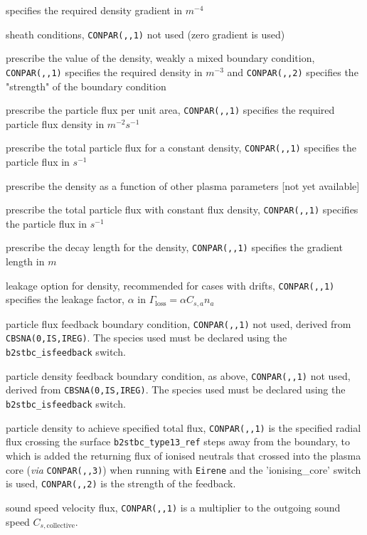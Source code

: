 \documentclass[a4paper,10pt]{report}
\begin{document}
\begin{description}
\begin{description}
  specifies the required density gradient in $m^{-4}$
  \item[3] sheath conditions, {\tt CONPAR(,,1)} not used (zero
  gradient is used)
  \item[4] prescribe the value of the density, weakly a mixed boundary
  condition, {\tt CONPAR(,,1)} specifies the required density in
  $m^{-3}$ and {\tt CONPAR(,,2)} specifies the "strength" of the
  boundary condition
  \item[5] prescribe the particle flux per unit area,
  {\tt CONPAR(,,1)} specifies the required particle flux density in
  $m^{-2} s^{-1}$
  \item[6] prescribe the total particle flux for a constant density,
  {\tt CONPAR(,,1)} specifies the particle flux in
  $s^{-1}$
  \item[7] prescribe the density as a function of other plasma
  parameters [not yet available]
  \item[8] prescribe the total particle flux with constant flux
  density, {\tt CONPAR(,,1)} specifies the particle flux in
  $s^{-1}$
  \item[9] prescribe the decay length for the density,
  {\tt CONPAR(,,1)} specifies the gradient length in $m$
  \item[10] leakage option for density, recommended for cases with drifts,
  {\tt CONPAR(,,1)} specifies the leakage factor,
  $\alpha$ in $\Gamma_{\mbox{loss}} = \alpha C_{s,a} n_a$
  \item[11] particle flux feedback boundary condition,
  {\tt CONPAR(,,1)} not used, derived from {\tt CBSNA(0,IS,IREG)}.
  The species used must be declared using the {\tt b2stbc\_isfeedback} switch.
  \item[12] particle density feedback boundary condition, as above,
  {\tt CONPAR(,,1)} not used, derived from {\tt CBSNA(0,IS,IREG)}.
  The species used must be declared using the {\tt b2stbc\_isfeedback} switch.
  \item[13] particle density to achieve specified total flux,
  {\tt CONPAR(,,1)} is the specified radial flux crossing the surface
  {\tt b2stbc\_type13\_ref} steps away from the boundary, to which is added
  the returning flux of ionised neutrals that crossed into the plasma core
  ({\it via} {\tt CONPAR(,,3)}) when running with {\tt Eirene} and the
  'ionising\_core' switch is used,
  {\tt CONPAR(,,2)} is the strength of the feedback.
  \item[14] sound speed velocity flux,
  {\tt CONPAR(,,1)} is a multiplier to the outgoing sound speed $C_{s, \mbox{collective}}$.

\end{description}
\end{description}
\end{document}
